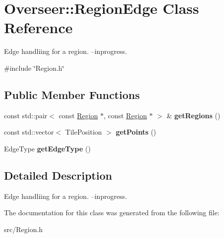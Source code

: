\hypertarget{classOverseer_1_1RegionEdge}{}\section{Overseer\+:\+:Region\+Edge Class Reference}
\label{classOverseer_1_1RegionEdge}


Edge handliing for a region. --inprogress.  




{\ttfamily \#include \char`\"{}Region.\+h\char`\"{}}

\subsection*{Public Member Functions}
\begin{DoxyCompactItemize}
\item 
const std\+::pair$<$ const \hyperlink{classOverseer_1_1Region}{Region} $\ast$, const \hyperlink{classOverseer_1_1Region}{Region} $\ast$ $>$ \& {\bfseries get\+Regions} ()\hypertarget{classOverseer_1_1RegionEdge_ac4df47c0027b8d5fcc1de39ba53741d9}{}\label{classOverseer_1_1RegionEdge_ac4df47c0027b8d5fcc1de39ba53741d9}

\item 
const std\+::vector$<$ Tile\+Position $>$ {\bfseries get\+Points} ()\hypertarget{classOverseer_1_1RegionEdge_abdc39850cd5c84600e72d0ad557aaf44}{}\label{classOverseer_1_1RegionEdge_abdc39850cd5c84600e72d0ad557aaf44}

\item 
Edge\+Type {\bfseries get\+Edge\+Type} ()\hypertarget{classOverseer_1_1RegionEdge_ae10890eae894662fb70d394f4706ea96}{}\label{classOverseer_1_1RegionEdge_ae10890eae894662fb70d394f4706ea96}

\end{DoxyCompactItemize}


\subsection{Detailed Description}
Edge handliing for a region. --inprogress. 

The documentation for this class was generated from the following file\+:\begin{DoxyCompactItemize}
\item 
src/Region.\+h\end{DoxyCompactItemize}
